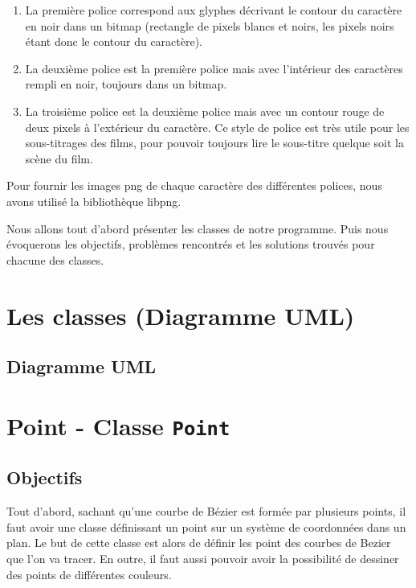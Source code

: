 \documentclass[a4paper, 12pt]{article}
\begin{document}
	\begin{enumerate}
		\item La première police correspond aux glyphes décrivant le contour du caractère en noir dans un bitmap (rectangle de pixels blancs et noirs, les pixels noirs étant donc le contour du caractère). 
		\item La deuxième police est la première police mais avec l’intérieur des caractères rempli en noir, toujours dans un bitmap. 
		\item La troisième police est la deuxième police mais avec un contour rouge de deux pixels à l’extérieur du caractère. Ce style de police est très utile pour les sous-titrages des films, pour pouvoir toujours lire le sous-titre quelque soit la scène du film. 
 	\end{enumerate}

	Pour fournir les images png de chaque caractère des différentes polices, nous avons utilisé la bibliothèque libpng.
\newline

Nous allons tout d’abord présenter les classes de notre programme. Puis nous évoquerons les objectifs, problèmes rencontrés et les solutions trouvés pour chacune des classes.


	
	\newpage

\section{Les classes (Diagramme UML)}			
\subsection{Diagramme UML}

\section{Point - Classe \texttt{Point}}	
\subsection{Objectifs}
	Tout d'abord, sachant qu'une courbe de Bézier est formée par plusieurs points, il faut avoir une classe définissant un point sur un système de coordonnées dans un plan. Le but de cette classe est alors de définir les point des courbes de Bezier que l'on va tracer. En outre, il faut aussi pouvoir avoir la possibilité de dessiner des points de différentes couleurs.
	
\end{document}
